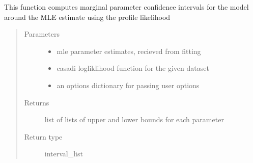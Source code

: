 \documentclass[letterpaper,10pt,english,openany,oneside]{sphinxmanual}
\begin{document}
\begin{fulllineitems}
\begin{fulllineitems}
\begin{quote}
\begin{description}
\end{description}\end{quote}

\end{fulllineitems}


\begin{fulllineitems}
\label{\detokenize{nloed:nloed.model.Model.__confidence_intervals}}
This function computes marginal parameter confidence intervals for the model
around the MLE estimate using the profile likelihood
\begin{quote}\begin{description}
\item[{Parameters}] \leavevmode\begin{itemize}
\item {} 
 \textendash{} mle parameter estimates,  recieved from fitting

\item {} 
 \textendash{} casadi logliklihood function for the given dataset

\item {} 
 \textendash{} an options dictionary for passing user options

\end{itemize}

\item[{Returns}] \leavevmode
list of lists of upper and lower bounds for each parameter

\item[{Return type}] \leavevmode
interval\_list

\end{description}\end{quote}

\end{fulllineitems}



\end{fulllineitems}
\end{document}
